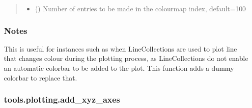 \documentclass[letterpaper,10pt,english]{sphinxmanual}
\begin{document}
\begin{fulllineitems}
\begin{quote}
\begin{description}
\begin{itemize}
\item {} 
\sphinxAtStartPar
{} (\sphinxstyleliteralemphasis{\sphinxupquote{, }}) \textendash{} Number of entries to be made in the colourmap index, default=100

\end{itemize}

\end{description}\end{quote}
\subsubsection*{Notes}

\sphinxAtStartPar
This is useful for instances such as when LineCollections are used to plot line that changes colour during the
plotting process, as LineCollections do not enable an automatic colorbar to be added to the plot. This function
adds a dummy colorbar to replace that.

\end{fulllineitems}



\subsubsection{tools.plotting.add\_xyz\_axes}
\label{\detokenize{_autosummary/tools.plotting.add_xyz_axes:tools-plotting-add-xyz-axes}}\label{\detokenize{_autosummary/tools.plotting.add_xyz_axes::doc}}
\end{document}
